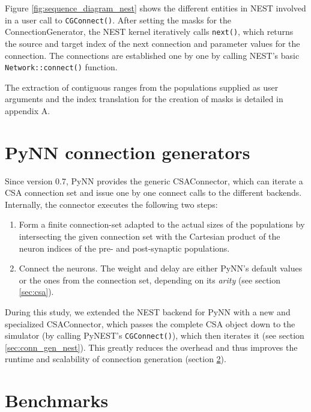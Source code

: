 \documentclass{frontiersSCNS} %
\begin{document}
Figure \ref{fig:sequence_diagram_nest} shows the different entities in
NEST involved in a user call to \verb|CGConnect()|. After setting the
masks for the ConnectionGenerator, the NEST kernel iteratively calls
\verb|next()|, which returns the source and target index of the next
connection and parameter values for the connection. The connections
are established one by one by calling NEST's basic
\verb|Network::connect()| function.

The extraction of contiguous ranges from the populations supplied as
user arguments and the index translation for the creation of masks is
detailed in appendix A.


\section{PyNN connection generators}\label{sec:conn_gen_pynn}

Since version 0.7, PyNN provides the generic CSAConnector, which can
iterate a CSA connection set and issue one by one connect calls to
the different backends. Internally, the connector executes the
following two steps:
\begin{enumerate}
\item Form a finite connection-set adapted to the actual sizes of the
  populations by intersecting the given connection set with the
  Cartesian product of the neuron indices of the pre- and
  post-synaptic populations.
\item Connect the neurons. The weight and delay are either PyNN's
  default values or the ones from the connection set, depending on its
  \emph{arity} (see section \ref{sec:csa}).
\end{enumerate}

During this study, we extended the NEST backend for PyNN with a new
and specialized CSAConnector, which passes the complete CSA object
down to the simulator (by calling PyNEST's \verb|CGConnect()|), which
then iterates it (see section \ref{sec:conn_gen_nest}). This greatly
reduces the overhead and thus improves the runtime and scalability of
connection generation (section \ref{sec:benchmarks}).


\section{Benchmarks}\label{sec:benchmarks}
\end{document}
